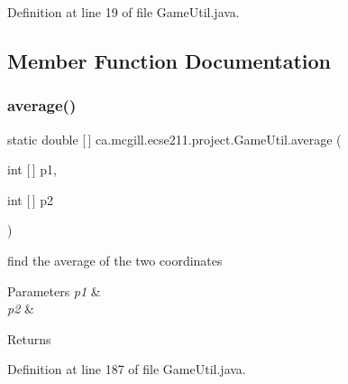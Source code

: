Definition at line 19 of file Game\+Util.\+java.



\subsection{Member Function Documentation}
\mbox{\label{classca_1_1mcgill_1_1ecse211_1_1project_1_1_game_util_ae5c5c445ab84516991219ca3783fcaa4}} 
\subsubsection{\texorpdfstring{average()}{average()}}
{\footnotesize\ttfamily static double \mbox{[}$\,$\mbox{]} ca.\+mcgill.\+ecse211.\+project.\+Game\+Util.\+average (\begin{DoxyParamCaption}\item[{int \mbox{[}$\,$\mbox{]}}]{p1,  }\item[{int \mbox{[}$\,$\mbox{]}}]{p2 }\end{DoxyParamCaption})\hspace{0.3cm}{\ttfamily [static]}}

find the average of the two coordinates 
\begin{DoxyParams}{Parameters}
{\em p1} & \\
\hline
{\em p2} & \\
\hline
\end{DoxyParams}
\begin{DoxyReturn}{Returns}

\end{DoxyReturn}


Definition at line 187 of file Game\+Util.\+java.


